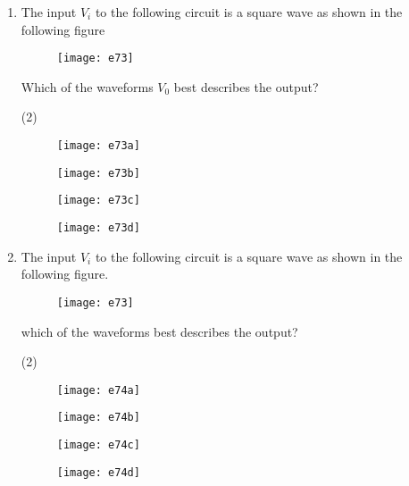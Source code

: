 \begin{enumerate}
\begin{tasks}
\end{tasks}
	\item The input $V_i$ to the following circuit is a square wave as shown in the following figure\\
	\begin{figure}[H]
		\centering
		\texttt{[image: e73]}
	\end{figure}
	Which of the waveforms $V_0$ best describes the output?
{	}
\begin{tasks}(2)
\task[\textbf{A.}] \begin{figure}[H]
	\centering
	\texttt{[image: e73a]}
\end{figure}
\task[\textbf{B.}] \begin{figure}[H]
	\centering
	\texttt{[image: e73b]}
\end{figure}
\task[\textbf{C.}] \begin{figure}[H]
	\centering
	\texttt{[image: e73c]}
\end{figure}
\task[\textbf{D.}] \begin{figure}[H]
	\centering
	\texttt{[image: e73d]}
\end{figure}
\end{tasks}
	\item The input $V_ i$ to the following circuit is a square wave as shown in the following figure.\\
	\begin{figure}[H]
		\centering
		\texttt{[image: e73]}
	\end{figure}
	which of the waveforms best describes the output?
{	}
\begin{tasks}(2)
\task[\textbf{A.}] \begin{figure}[H]
	\centering
	\texttt{[image: e74a]}
\end{figure}
\task[\textbf{B.}] \begin{figure}[H]
	\centering
	\texttt{[image: e74b]}
\end{figure}
\task[\textbf{C.}] \begin{figure}[H]
	\centering
	\texttt{[image: e74c]}
\end{figure}
\task[\textbf{D.}]\begin{figure}[H]
	\centering
	\texttt{[image: e74d]}
\end{figure}
\end{tasks}

\end{enumerate}
